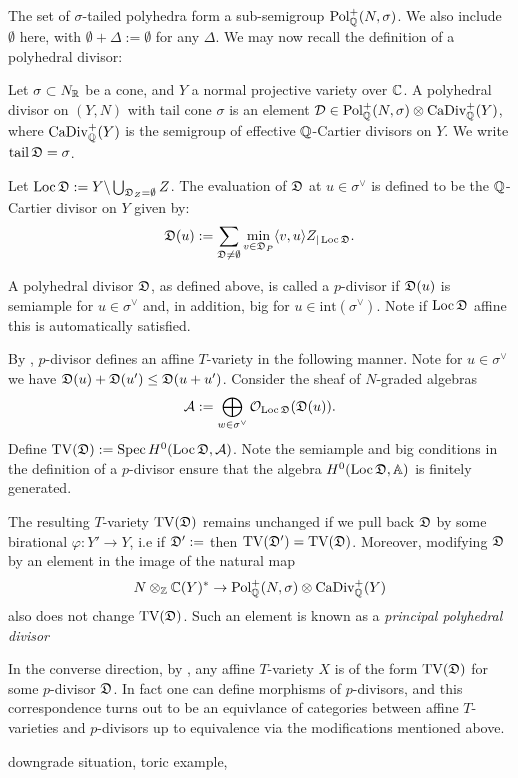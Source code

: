 The set of \(\sigma\)-tailed polyhedra form a sub-semigroup \(\operatorname{Pol}_{\mathbb{Q}}^+(N,\sigma)\). We also include \(\emptyset\) here, with \(\emptyset + \Delta := \emptyset\) for any \(\Delta\). We may now recall the definition of a polyhedral divisor:
\begin{definition}
Let \(\sigma \subset N_{\mathbb{R}}\) be a cone, and \(Y\) a normal projective variety over \(\mathbb{C}\). A polyhedral divisor on \((Y,N)\) with tail cone \(\sigma\) is an element \(\mathcal{D} \in \operatorname{Pol}_{\mathbb{Q}}^+(N,\sigma) \otimes \operatorname{CaDiv}_{\mathbb{Q}}^+(Y)\), where \(\operatorname{CaDiv}_{\mathbb{Q}}^+(Y)\) is the semigroup of effective \(\mathbb{Q}\)-Cartier divisors on \(Y\). We write \(\operatorname{tail} {\mathfrak{D}} = \sigma\).
\end{definition}
Let \(\operatorname{Loc} {\mathfrak{D}} := Y \backslash \bigcup_{{\mathfrak{D}}_Z = \emptyset} Z\). The evaluation of \({\mathfrak{D}}\) at \(u \in \sigma^\vee\) is defined to be the \(\mathbb{Q}\)-Cartier divisor on \(Y\) given by:
\[
{\mathfrak{D}}(u) :=  \sum_{{\mathfrak{D}} \neq \emptyset} \min_{v \in {\mathfrak{D}}_P} \langle v,u \rangle Z_{|\operatorname{Loc} {\mathfrak{D}}}.
\]
\begin{definition}
A polyhedral divisor \({\mathfrak{D}}\), as defined above, is called a \(p\)-divisor if \({\mathfrak{D}}(u)\) is semiample for \(u \in \sigma^\vee\) and, in addition, big for \(u \in \text{int}(\sigma^\vee)\). Note if \(\operatorname{Loc} {\mathfrak{D}}\) affine this is automatically satisfied.
\end{definition}

By \cite[Proposition 3.1]{hausen2018torus}, \(p\)-divisor defines an affine \(T\)-variety in the following manner. Note for \(u \in \sigma^\vee\) we have \({\mathfrak{D}}(u) + {\mathfrak{D}}(u') \le {\mathfrak{D}}(u+u')\). Consider the sheaf of \(N\)-graded algebras
\[
\mathcal{A} := \bigoplus_{w \in \sigma^{\vee}} \mathcal{O}_{\operatorname{Loc} {\mathfrak{D}}} ({\mathfrak{D}}(u)).
\]
Define \(\operatorname{TV}({\mathfrak{D}}) := \operatorname{Spec} H^0(\operatorname{Loc} {\mathfrak{D}}, \mathcal{A}) \). Note the semiample and big conditions in the definition of a \(p\)-divisor ensure that the algebra \(H^0(\operatorname{Loc} {\mathfrak{D}}, \mathbb{A})\) is finitely generated.

The resulting \(T\)-variety \(\operatorname{TV}({\mathfrak{D}})\) remains unchanged if we pull back \({\mathfrak{D}}\) by some birational \(\varphi: Y' \to Y\), i.e if \({\mathfrak{D}}' := \) then \(\operatorname{TV}({\mathfrak{D}}') = \operatorname{TV}({\mathfrak{D}})\). Moreover, modifying \({\mathfrak{D}}\) by an element in the image of the natural map
\[
N \otimes_{\mathbb{Z}} \mathbb{C}(Y)^* \to \operatorname{Pol}_{\mathbb{Q}}^+(N,\sigma) \otimes \operatorname{CaDiv}_{\mathbb{Q}}^+(Y)
\]
also does not change \(\operatorname{TV}({\mathfrak{D}})\). Such an element is known as a \textit{principal polyhedral divisor}

In the converse direction, by \cite[Proposition 3.4]{hausen2018torus}, any affine \(T\)-variety \(X\) is of the form \(\operatorname{TV}({\mathfrak{D}})\) for some \(p\)-divisor \({\mathfrak{D}}\). In fact one can define morphisms of \(p\)-divisors, and this correspondence turns out to be an equivlance of categories between affine \(T\)-varieties and \(p\)-divisors up to equivalence via the modifications mentioned above.
\begin{example}
downgrade situation, toric example,
\end{example}

